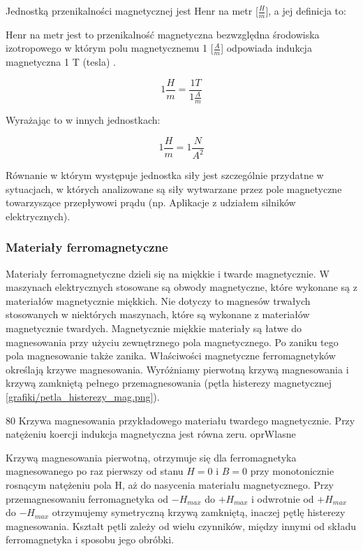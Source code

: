 Jednostką przenikalności magnetycznej jest Henr na metr [$ \frac{H}{m} $], a jej definicja to:

\begin{defn}
	Henr na metr jest to przenikalność magnetyczna bezwzględna środowiska izotropowego w którym polu magnetycznemu 1 [$ \frac{A}{m} $] odpowiada indukcja magnetyczna 1 T (tesla) \cite{kaluszko}.
	
	\begin{equation} \label{eq:indmag4}
		1 \frac{H}{m} = \frac{1 T}{1 \frac{A}{m}}
	\end{equation}
\end{defn}

Wyrażając to w innych jednostkach:

\begin{equation} \label{eq:indmag4}
	1 \frac{H}{m} = 1 \frac{N}{A^2}
\end{equation}

Równanie w którym występuje jednostka siły jest szczególnie przydatne w sytuacjach, w których analizowane są siły wytwarzane przez pole magnetyczne towarzyszące przepływowi prądu (np. Aplikacje z udziałem silników elektrycznych).

\subsubsection{Materiały ferromagnetyczne} 

Materiały ferromagnetyczne dzieli się na miękkie i twarde magnetycznie. W maszynach elektrycznych stosowane są obwody magnetyczne, które wykonane są z materiałów magnetycznie miękkich. Nie dotyczy to magnesów trwałych stosowanych w niektórych maszynach, które są wykonane z materiałów magnetycznie twardych. Magnetycznie miękkie materiały są łatwe do magnesowania przy użyciu zewnętrznego pola magnetycznego. Po zaniku tego pola magnesowanie także zanika. Właściwości magnetyczne ferromagnetyków określają krzywe magnesowania. Wyróżniamy pierwotną krzywą magnesowania i krzywą zamkniętą pełnego przemagnesowania (pętla histerezy magnetycznej \ref{grafiki/petla_histerezy_mag.png}).

		{80}   
	   	{Krzywa magnesowania przykładowego materiału twardego magnetycznie. Przy natężeniu koercji indukcja magnetyczna jest równa zeru.}
	   	{oprWlasne}
	   
Krzywą magnesowania pierwotną, otrzymuje się dla ferromagnetyka magnesowanego po raz pierwszy od stanu $ H = 0 $ i $ B = 0 $ przy monotonicznie rosnącym natężeniu pola H, aż do nasycenia materiału magnetycznego. Przy przemagnesowaniu ferromagnetyka od $ -H_{max} $ do $ +H_{max} $ i odwrotnie od $ +H_{max} $ do $ -H_{max} $ otrzymujemy symetryczną krzywą zamkniętą, inaczej pętlę histerezy magnesowania. Kształt pętli zależy od wielu czynników, między innymi od składu ferromagnetyka i sposobu jego obróbki. \\

